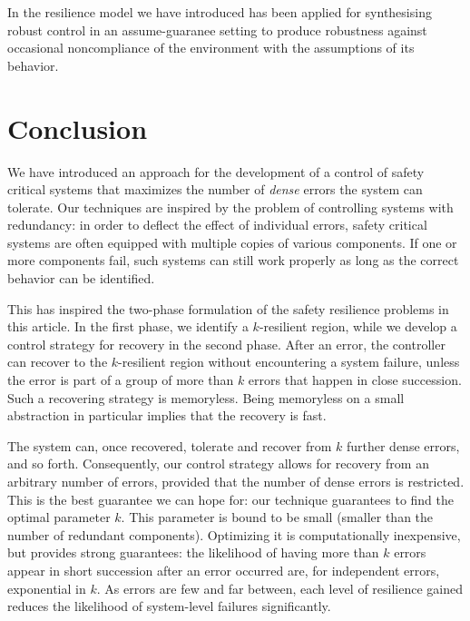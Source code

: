 

In \cite{EhlersT14,BloemEJK14} the resilience model we have introduced \cite{HPSW/12/rapidRecovery} has been applied for synthesising robust control in an assume-guaranee setting to produce robustness against occasional noncompliance of the environment with the assumptions of its behavior.


\section{Conclusion \label{sec.conc}}
We have introduced an approach for the development of a control of safety critical
systems that maximizes the number of \emph{dense} errors the system can tolerate.
Our techniques are inspired by the problem of controlling systems with redundancy:
in order to deflect the effect of individual errors, safety critical systems are often equipped with multiple copies of various components.
If one or more components fail, such systems can still work properly as long as the correct behavior can be identified.
 
This has inspired the two-phase formulation of the safety resilience problems in this article.
In the first phase, we identify a $k$-resilient region\label{reply2.need.identify},  
while\label{reply2.layer} we develop a control strategy for recovery in the second phase.  
After an error, the controller can recover to the $k$-resilient region without encountering a system failure, unless the error is part of a group of more than $k$ errors that happen in close succession.
Such a recovering strategy is memoryless.
Being memoryless on a small abstraction in particular implies that the recovery is fast.

The system can, once recovered, tolerate and recover from $k$ further dense errors, and so forth.
Consequently, our control strategy allows for recovery from an arbitrary
number of errors, provided that the number of dense errors is restricted.
This is the best guarantee we can hope for: our technique guarantees to find the optimal parameter $k$.
%
This parameter is bound to be small (smaller than the number of redundant components).
Optimizing it is computationally inexpensive, but provides strong guarantees: the likelihood of having more than $k$ errors appear in short succession after an error occurred are, for independent errors, exponential in $k$. As errors are few and far between, each level of resilience gained reduces the likelihood of 
system-level failures significantly.